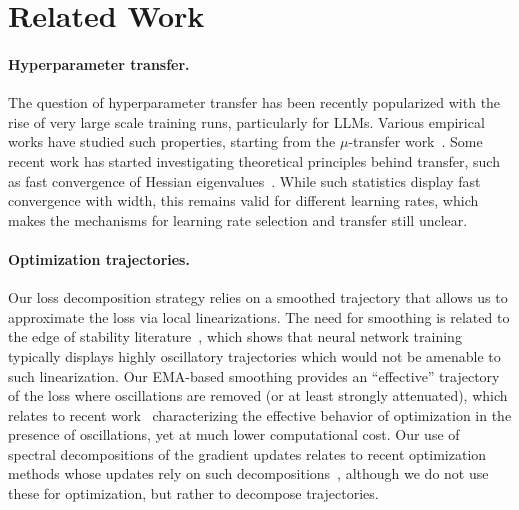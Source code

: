 \section{Related Work}\label{app:related_work}

\paragraph{Hyperparameter transfer.}
The question of hyperparameter transfer has been recently popularized with the rise of very large scale training runs, particularly for LLMs. Various empirical works have studied such properties, starting from the $\mu$-transfer work~\cite{yang2022tensor}. Some recent work has started investigating theoretical principles behind transfer, such as fast convergence of Hessian eigenvalues~\cite{noci2024super}. While such statistics display fast convergence with width, this remains valid for different learning rates, which makes the mechanisms for learning rate selection and transfer still unclear. 

\paragraph{Optimization trajectories.}
Our loss decomposition strategy relies on a smoothed trajectory that allows us to approximate the loss via local linearizations. The need for smoothing is related to the edge of stability literature~\cite[e.g.,][]{cohen2021gradient}, which shows that neural network training typically displays highly oscillatory trajectories which would not be amenable to such linearization. Our EMA-based smoothing provides an ``effective'' trajectory of the loss where oscillations are removed (or at least strongly attenuated), which relates to recent work~\cite{cohen2024understanding} characterizing the effective behavior of optimization in the presence of oscillations, yet at much lower computational cost.
Our use of spectral decompositions of the gradient updates relates to recent optimization methods whose updates rely on such decompositions~\cite{gupta2018shampoo,zhao2024galore,vyas2024soap,jordan2024muon}, although we do not use these for optimization, but rather to decompose trajectories.


